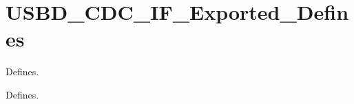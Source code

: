 \hypertarget{group__USBD__CDC__IF__Exported__Defines}{}\section{U\+S\+B\+D\+\_\+\+C\+D\+C\+\_\+\+I\+F\+\_\+\+Exported\+\_\+\+Defines}
\label{group__USBD__CDC__IF__Exported__Defines}


Defines.  


Defines. 

